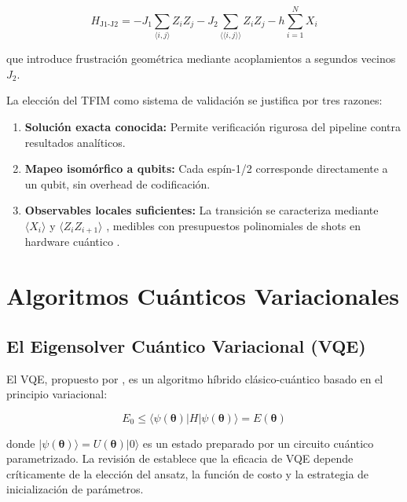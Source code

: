 \documentclass[11pt,a4paper,spanish]{book}
\begin{document}
\begin{equation}
H_{\text{J1-J2}} = -J_1 \sum_{\langle i,j \rangle} Z_i Z_j - J_2 \sum_{\langle\langle i,j \rangle\rangle} Z_i Z_j - h \sum_{i=1}^{N} X_i
\label{eq:tfim_frustrated}
\end{equation}

\noindent que introduce frustración geométrica mediante acoplamientos a segundos vecinos $J_2$.

La elección del TFIM como sistema de validación se justifica por tres razones:

\begin{enumerate}
    \item \textbf{Solución exacta conocida:} Permite verificación rigurosa del pipeline contra resultados analíticos.
    \item \textbf{Mapeo isomórfico a qubits:} Cada espín-1/2 corresponde directamente a un qubit, sin overhead de codificación.
    \item \textbf{Observables locales suficientes:} La transición se caracteriza mediante $\langle X_i \rangle$ y $\langle Z_i Z_{i+1} \rangle$ \citep{dutta2015}, medibles con presupuestos polinomiales de shots en hardware cuántico \citep{cerezo2021}.
\end{enumerate}

\section{Algoritmos Cuánticos Variacionales}

\subsection{El Eigensolver Cuántico Variacional (VQE)}

El VQE, propuesto por \citet{peruzzo2014}, es un algoritmo híbrido clásico-cuántico basado en el principio variacional:

\begin{equation}
E_0 \leq \langle \psi(\boldsymbol{\theta}) | H | \psi(\boldsymbol{\theta}) \rangle = E(\boldsymbol{\theta})
\label{eq:variational}
\end{equation}

\noindent donde $|\psi(\boldsymbol{\theta})\rangle = U(\boldsymbol{\theta})|0\rangle$ es un estado preparado por un circuito cuántico parametrizado. La revisión de \citet{tilly2022} establece que la eficacia de VQE depende críticamente de la elección del ansatz, la función de costo y la estrategia de inicialización de parámetros.
\end{document}
